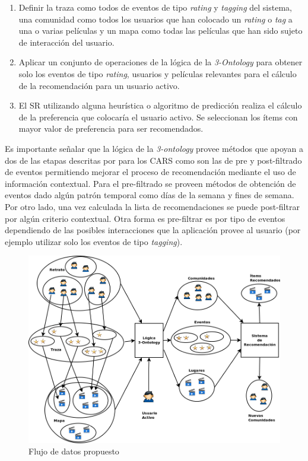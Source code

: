 \begin{enumerate}
	\item Definir la traza como todos de eventos de tipo \textit{rating} y \textit{tagging} del sistema, una comunidad como todos los usuarios que han colocado un \textit{rating} o \textit{tag} a una o varias películas y un mapa como todas las películas que han sido sujeto de interacción del usuario.
	\item Aplicar un conjunto de operaciones de la lógica de la \textit{3-Ontology} para obtener solo los eventos de tipo \textit{rating}, usuarios y películas relevantes para el cálculo de la recomendación para un usuario activo.
	\item El SR utilizando alguna heurística o algoritmo de predicción realiza el cálculo de la preferencia que colocaría el usuario activo. Se seleccionan los ítems con mayor valor de preferencia para ser recomendados.
\end{enumerate}

Es importante señalar que la lógica de la \textit{3-ontology} provee métodos que apoyan a dos de las etapas descritas por \cite{Adomavicius:2011} para los CARS como son las de pre y post-filtrado de eventos permitiendo mejorar el proceso de recomendación mediante el uso de información contextual. Para el pre-filtrado se proveen métodos de obtención de eventos dado algún patrón temporal como días de la semana y fines de semana. Por otro lado, una vez calculada la lista de recomendaciones se puede post-filtrar por algún criterio contextual. Otra forma es pre-filtrar es por tipo de eventos dependiendo de las posibles interacciones que la aplicación provee al usuario (por ejemplo utilizar solo los eventos de tipo \textit{tagging}).

\begin{figure}[tp]
	\centering
	\includegraphics[scale=.5]{images/diagramdeflujopropuesto.png}
	\caption{Flujo de datos propuesto}
	\label{fig:flujodedatos3ontology}
\end{figure}

